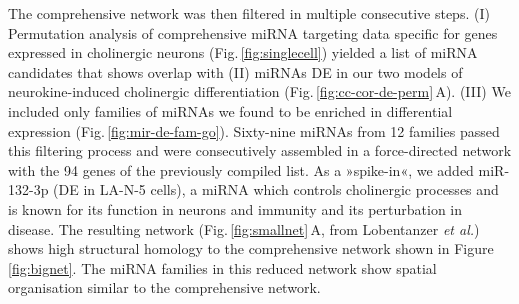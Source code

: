 The comprehensive network was then filtered in multiple consecutive steps. (I) Permutation analysis of comprehensive miRNA targeting data specific for genes expressed in cholinergic neurons (Fig.\,\ref{fig:singlecell}) yielded a list of miRNA candidates that shows overlap with (II) miRNAs DE in our two models of neurokine-induced cholinergic differentiation (Fig.\,\ref{fig:cc-cor-de-perm}\,A). (III) We included only families of miRNAs we found to be enriched in differential expression (Fig.\,\ref{fig:mir-de-fam-go}). Sixty-nine miRNAs from 12 families passed this filtering process and were consecutively assembled in a force-directed network with the 94 genes of the previously compiled list. As a »spike-in«, we added miR-132-3p (DE in LA-N-5 cells), a miRNA which controls cholinergic processes\cite{Shaltiel2013, Hanin2018} and is known for its function in neurons\cite{Mellios2011} and immunity\cite{Shaked2009} and its perturbation in disease.\cite{Pichler2017} The resulting network (Fig.\,\ref{fig:smallnet}\,A, from Lobentanzer \emph{et al.}\cite{Lobentanzer2019a}) shows high structural homology to the comprehensive network shown in Figure \ref{fig:bignet}. The miRNA families in this reduced network show spatial organisation similar to the comprehensive network. 

